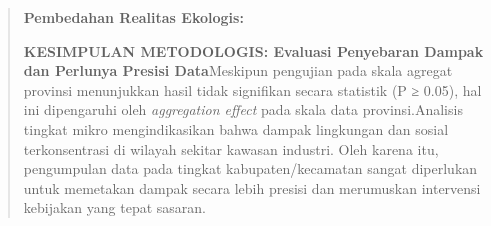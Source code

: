 \documentclass[
]{article}
\begin{document}
\begin{quote}
\textbf{Pembedahan Realitas Ekologis:}

\textbf{KESIMPULAN METODOLOGIS: Evaluasi Penyebaran Dampak dan Perlunya
Presisi Data}Meskipun pengujian pada skala agregat provinsi menunjukkan
hasil tidak signifikan secara statistik (P ≥ 0.05), hal ini dipengaruhi
oleh \emph{aggregation effect} pada skala data provinsi.Analisis tingkat
mikro mengindikasikan bahwa dampak lingkungan dan sosial terkonsentrasi
di wilayah sekitar kawasan industri. Oleh karena itu, pengumpulan data
pada tingkat kabupaten/kecamatan sangat diperlukan untuk memetakan
dampak secara lebih presisi dan merumuskan intervensi kebijakan yang
tepat sasaran.
\end{quote}
\end{document}
